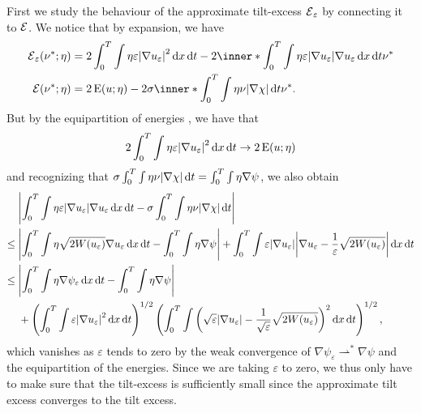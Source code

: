 First we study the behaviour of the approximate tilt-excess $ \tilt_excess_{ 
\varepsilon } $ by connecting it to $ \tilt_excess $. We notice that by 
expansion, we have
\begin{align*}
	\tilt_excess_{ \varepsilon } ( \nu^{ \ast } ; \eta )
	& =
	2
	\int_{ 0 }^{ T }
	\int
	\eta
	\varepsilon 
	\abs{ \nabla u_{ \varepsilon } }^{ 2 }
	\dd{ x }
	\dd{ t }
	-
	2 
	\inner*{\int_{ 0 }^{ T }
		\int
		\eta
		\varepsilon
		\abs{ \nabla u_{ \varepsilon } }
		\nabla u_{ \varepsilon }
		\dd{ x }
		\dd{ t } }
	{ \nu^{ \ast } }
	\\
	\tilt_excess ( \nu^{ \ast } ; \eta )
	& =
	2 \energy ( u ; \eta )
	-
	2 \sigma
	\inner*{
		\int_{ 0 }^{ T }
		\int
		\eta
		\nu 
		\abs{ \nabla \chi }
		\dd{ t }
	}{ \nu^{ \ast } }.
\end{align*}
But by the equipartition of energies , we have 
that
\begin{equation*}
	2 \int_{ 0 }^{ T }
	\int
	\eta \varepsilon 
	\abs{ \nabla u_{ \varepsilon } }^{ 2 }
	\dd{ x }
	\dd{ t }
	\to 
	2 \operatorname{E} ( u ; \eta )
\end{equation*} 
and recognizing that $ \sigma \int_{0 }^{ T } \int \eta \nu \abs{ \nabla \chi } 
\dd{ t } = \int_{ 0 }^{ T } \int \eta \nabla \psi $, we also obtain
\begin{align*}
	& 
	\abs{ 
		\int_{ 0 }^{ T }
		\int
		\eta
		\varepsilon
		\abs{ \nabla u_{ \varepsilon } }
		\nabla u_{ \varepsilon }
		\dd{ x }
		\dd{ t }
		-
		\sigma
		\int_{ 0 }^{ T }
		\int
		\eta
		\nu 
		\abs{ \nabla \chi }
		\dd{ t }
	}
	\\
	\leq {} &
	\abs{
		\int_{ 0 }^{ T }
		\int	
		\eta
		\sqrt{ 2 W ( u_{ \varepsilon } ) }
		\nabla u_{ \varepsilon }
		\dd{ x }
		\dd{ t }
		-
		\int_{ 0 }^{ T }
		\int
		\eta
		\nabla \psi
	}
	+
	\int_{ 0 }^{ T }
	\int
	\varepsilon
	\abs{ \nabla u_{ \varepsilon } }
	\abs{ \nabla u_{ \varepsilon } - \frac{ 1 }{ \varepsilon } \sqrt{ 2 W ( u_{ 
	\varepsilon } ) } }
	\dd{ x }
	\dd{ t }
	\\
	\leq {} &
	\abs{
		\int_{ 0 }^{ T }
		\int
		\eta
		\nabla \psi_{ \varepsilon } 
		\dd{ x }
		\dd{ t }
		-
		\int_{ 0 }^{ T }
		\int
		\eta
		\nabla \psi 
	}
	\\
	& +
	\left(
	\int_{ 0 }^{ T }
	\int
	\varepsilon \abs{ \nabla u_{ \varepsilon } }^{ 2 }
	\dd{ x }
	\dd{ t }
	\right)^{ 1/2 }
	\left(
	\int_{ 0 }^{ T }
	\int
	\left(
	\sqrt{ \varepsilon }
	\abs{ \nabla u_{ \varepsilon } }
	-
	\frac{ 1 }{ \sqrt{ \varepsilon } }
	\sqrt{ 2 W ( u_{ \varepsilon } ) }
	\right)^{ 2 }
	\dd{ x }
	\dd{ t }
	\right)^{ 1/2 },
\end{align*}
which vanishes as $ \varepsilon $ tends to zero by the weak convergence of $ 
\nabla \psi_{ \varepsilon } \rightharpoonup^{ \ast } \nabla \psi $ and the 
equipartition of the energies.
Since we are taking $ \varepsilon $ to zero, we thus only have to make sure 
that 
the tilt-excess is sufficiently small since the approximate tilt excess 
converges to the tilt excess.

